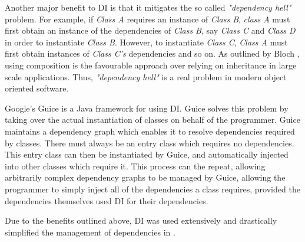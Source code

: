 Another major benefit to DI is that it mitigates the so called \textit{"dependency hell"} problem. For example, if \textit{Class A} requires an instance of \textit{Class B}, \textit{class A} must first obtain an instance of the dependencies of \textit{Class B}, say \textit{Class C} and \textit{Class D} in order to instantiate \textit{Class B}. However, to instantiate \textit{Class C}, \textit{Class A} must first obtain instances of \textit{Class C's} dependencies and so on. As outlined by Bloch \cite{effecitve-java}, using composition is the favourable approach over relying on inheritance in large scale applications. Thus, \textit{"dependency hell"} is a real problem in modern object oriented software.

Google's Guice \cite{guice} is a Java framework for using DI. Guice solves this problem by taking over the actual instantiation of classes on behalf of the programmer. Guice maintains a dependency graph which enables it to resolve dependencies required by classes. There must always be an entry class which requires no dependencies. This entry class can then be instantiated by Guice, and automatically injected into other classes which require it. This process can the repeat, allowing arbitrarily complex dependency graphs to be managed by Guice, allowing the programmer to simply inject all of the dependencies a class requires, provided the dependencies themselves used DI for their dependencies.

Due to the benefits outlined above, DI was used extensively and drastically simplified the management of dependencies in \game{}.